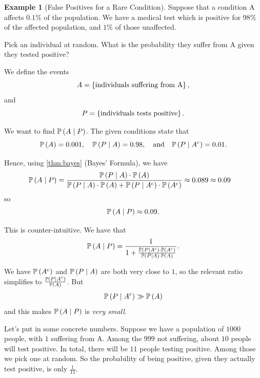 \documentclass{article}
\theoremstyle{definition}
\newtheorem{example}[theorem]{Example}
\theoremstyle{remark}
\newcommand{\Prob}{\mathbb{P}}
\newcommand{\Conditional}[2]{#1\mid #2}
\newcommand{\compl}{^{\mathrm{c}}}
\newcommand{\qand}{\quad\text{and}\quad}
\begin{document}
\begin{example}[False Positives for a Rare Condition]
    \label{ex:false-positives}%
    Suppose that a condition A affects \(0.1\%\) of the population. We have a medical test which is positive for \(98\%\) of the affected population, and \(1\%\) of those unaffected.

    Pick an individual at random. What is the probability they suffer from A given they tested positive?

    We define the events
    \[
        A = \left\{\text{individuals suffering from A}\right\},
    \]
    and
    \[
        P = \left\{\text{individuals tests positive}\right\}.
    \]

    We want to find \(\Prob\pqty{\Conditional{A}{P}}\). The given conditions state that
    \[
        \Prob\pqty{A} = 0.001, \quad \Prob\pqty{\Conditional{P}{A}} = 0.98, \qand \Prob\pqty{\Conditional{P}{A\compl}} = 0.01.
    \]

    Hence, using \autoref{thm:bayes} (Bayes' Formula), we have
    \begin{align*}
        \Prob\pqty{\Conditional{A}{P}} &= \frac{\Prob\pqty{\Conditional{P}{A}} \cdot \Prob\pqty{A}}{\Prob\pqty{\Conditional{P}{A}} \cdot \Prob\pqty{A} + \Prob\pqty{\Conditional{P}{A\compl}} \cdot \Prob\pqty{A\compl}} \approx 0.089 \approx 0.09
    \end{align*}
    so
    \[
        \Prob\pqty{\Conditional{A}{P}} \approx 0.09.
    \]

    This is counter-intuitive. We have that
    \[
        \Prob\pqty{\Conditional{A}{P}} = \frac{1}{1 + \frac{\Prob\pqty{\Conditional{P}{A\compl}} \cdot \Prob\pqty{A\compl}}{\Prob\pqty{\Conditional{P}{A}} \cdot \Prob\pqty{A}}}.
    \]

    We have \(\Prob\pqty{A\compl}\) and \(\Prob\pqty{\Conditional{P}{A}}\) are both very close to \(1\), so the relevant ratio simplifies to \(\frac{\Prob\pqty{\Conditional{P}{A\compl}}}{\Prob\pqty{A}}\). But
    \[
        \Prob\pqty{\Conditional{P}{A\compl}} \gg \Prob\pqty{A}
    \]
    and this makes \(\Prob\pqty{\Conditional{A}{P}}\) is \emph{very small}.

    Let's put in some concrete numbers. Suppose we have a population of \(1000\) people, with \(1\) suffering from A. Among the \(999\) not suffering, about \(10\) people will test positive. In total, there will be \(11\) people testing positive. Among those we pick one at random. So the probability of being positive, given they actually test positive, is only \(\frac{1}{11}\).
\end{example}
\end{document}
